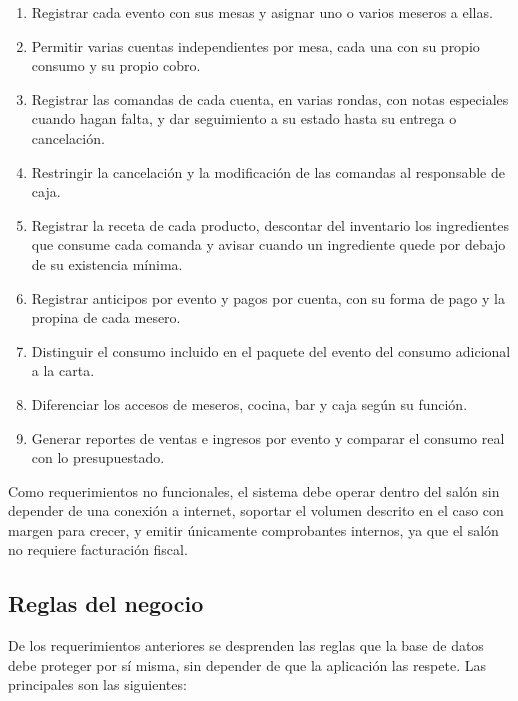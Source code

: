 \begin{enumerate}[label=\arabic*.]
    \item Registrar cada evento con sus mesas y asignar uno o varios meseros a ellas.
    \item Permitir varias cuentas independientes por mesa, cada una con su propio consumo y su propio cobro.
    \item Registrar las comandas de cada cuenta, en varias rondas, con notas especiales cuando hagan falta, y dar seguimiento a su estado hasta su entrega o cancelación.
    \item Restringir la cancelación y la modificación de las comandas al responsable de caja.
    \item Registrar la receta de cada producto, descontar del inventario los ingredientes que consume cada comanda y avisar cuando un ingrediente quede por debajo de su existencia mínima.
    \item Registrar anticipos por evento y pagos por cuenta, con su forma de pago y la propina de cada mesero.
    \item Distinguir el consumo incluido en el paquete del evento del consumo adicional a la carta.
    \item Diferenciar los accesos de meseros, cocina, bar y caja según su función.
    \item Generar reportes de ventas e ingresos por evento y comparar el consumo real con lo presupuestado.
\end{enumerate}

Como requerimientos no funcionales, el sistema debe operar dentro del salón sin depender de una conexión a internet, soportar el volumen descrito en el caso con margen para crecer, y emitir únicamente comprobantes internos, ya que el salón no requiere facturación fiscal.

\subsection{Reglas del negocio}

De los requerimientos anteriores se desprenden las reglas que la base de datos debe proteger por sí misma, sin depender de que la aplicación las respete. Las principales son las siguientes:

